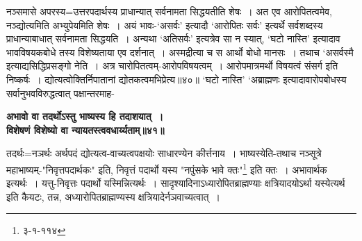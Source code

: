 {{{{ नञ्समासे अपरस्य=उत्तरपदार्थस्य प्राधान्यात् सर्वनामता सिद्धयतीति शेषः~।
अत एव आरोपितत्वमेव, नञ्द्योत्यमिति अभ्युपेयमिति शेषः~।
 अयं भावः-`असर्वः' इत्यादौ `आरोपितः सर्वः' इत्यर्थे सर्वशब्दस्य प्राधान्याबाधात् सर्वनामता सिद्धयति~।
अन्यथा `अतिसर्वः' इत्यत्रेव सा न स्यात्, `घटो नास्ति' इत्यादाव भावविषयकबोधे तस्य विशेष्यताया एव दर्शनात्~।
अस्मद्रीत्या च स आर्थो बोधो मानसः~।
 तथाच `असर्वस्मै इत्याद्यसिद्धिप्रसङ्गो नेति~।
अत्र चारोपितत्वम्-आरोपविषयत्वम्~।
आरोपमात्रमर्थो विषयत्वं संसर्ग इति निष्कर्षः~।
द्योत्यत्वोक्तिर्निपातानां द्योतकत्वमभिप्रेत्य॥४०॥
 `घटो नास्ति' `अब्राह्मणः इत्यादावारोपबोधस्य सर्वानुभवविरुद्धत्वात् पक्षान्तरमाह-
\begin{center}{\bfseries अभावो वा तदर्थोऽस्तु भाष्यस्य हि तदाशयात्~।\\
 विशेषणं विशेष्यो वा न्यायतस्त्ववधार्य्यताम्॥४१॥}\end{center}

 तदर्थः=नञर्थः अर्थपदं द्योत्यत्व-वाच्यत्वपक्षयोः साधारण्येन कीर्त्तनाय~।
भाष्यस्येति-तथाच नञ्सूत्रे महाभाष्यम्-"निवृत्तपदार्थकः" इति, निवृत्तं पदार्थो यस्य "नपुंसके भावे क्तः"\footnote{३-१-११४} इति क्तः~।
अभावार्थक इत्यर्थः~।
 यत्तु-निवृत्तः पदार्थो यस्मिन्नित्यर्थः~।
सादृश्यादिनाऽध्यारोपितब्राह्मण्याः क्षत्रियादयोऽर्था यस्येत्यर्थ इति कैयटः, तन्न, अध्यारोपितब्राह्मण्यस्य क्षत्रियादेर्नञवाच्यत्वात्~।

}}}}
